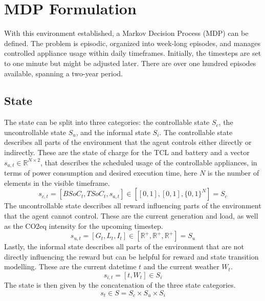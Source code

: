 \documentclass{article}
\theoremstyle{plain}
\theoremstyle{definition}
\theoremstyle{remark}
\begin{document}
\section{MDP Formulation}
With this environment established, a Markov Decision Process (MDP) can be defined. The problem is episodic, organized into week-long episodes, and manages controlled appliance usage within daily timeframes. Initially, the timesteps are set to one minute but might be adjusted later. There are over one hundred episodes available, spanning a two-year period.

\subsection{State}
The state can be split into three categories: the controllable state $S_c$, the uncontrollable state $S_u$, and the informal state $S_i$. The controllable state describes all parts of the environment that the agent controls either directly or indirectly. These are the state of charge for the TCL and battery and a vector $s_{a,t} \in \mathbb{R}^{N \times 2}$, that describes the scheduled usage of the controllable appliances, in terms of power consumption and desired execution time, here $N$ is the number of elements in the visible timeframe.
\begin{equation}
    s_{c, t} = [BSoC_t, TSoC_t, s_{a,t}] \in  [[0,1],[0,1],\{0,1\}^N]= S_c
\end{equation}   
The uncontrollable state describes all reward influencing parts of the environment that the agent cannot control. These are the current generation and load, as well as the CO2eq intensity for the upcoming timestep.
\begin{equation}
    s_{u, t} = [G_t, L_t, I_t] \in [\mathbb{R}^+, \mathbb{R}^+, \mathbb{R}^+]= S_u
\end{equation}
Lastly, the informal state describes all parts of the environment that are not directly influencing the reward but can be helpful for reward and state transition modelling. These are the current datetime $t$ and the current weather $W_t$.
\begin{equation}
    s_{i,t} = [t, W_t] \in S_i
\end{equation}
The state is then given by the concatenation of the three state categories.
\begin{equation}
    s_t \in S = S_c \times S_u \times S_i
\end{equation}
\end{document}
